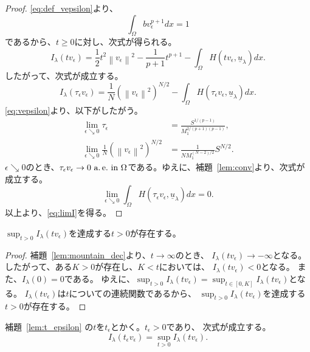 \begin{proof}
 \eqref{eq:def_vepsilon}より、
 \[
  \int_\Omega bv_\epsilon^{p+1} dx = 1
 \]
 であるから、$t \geq 0$に対し、次式が得られる。
 \[
  I_\lambda(tv_\epsilon) = \frac{1}{2} t^2 \left\| v_\epsilon
 \right\|^2 - \frac{1}{p+1} t^{p+1} - \int_\Omega H(tv_\epsilon,
 \underline{u}_\lambda) dx.
 \]
 したがって、次式が成立する。
 \[
  I_\lambda(\tau_\epsilon v_\epsilon) = \frac{1}{N} \left( \left\|
 v_\epsilon \right\|^2 \right)^{N/2} - \int_\Omega H(\tau_\epsilon
 v_\epsilon, \underline{u}_\lambda) dx.
 \]
 \eqref{eq:vepsilon}より、以下がしたがう。
 \begin{align*}
  \lim_{\epsilon \searrow 0} \tau_\epsilon
  &= \frac{S^{1/(p-1)}}{M_1^{2/(p+1)(p-1)}}, \\
  \lim_{\epsilon \searrow 0} \frac{1}{N} \left( \left\|
 v_\epsilon \right\|^2 \right)^{N/2} &= \frac{1}{NM_1^{(N-2)/2}}
  S^{N/2}.
 \end{align*}
 $\epsilon \searrow 0$のとき、$\tau_\epsilon v_\epsilon \to 0 ~\text{a.\,e.}~
 \text{in}~ \Omega$である。ゆえに、補題~\ref{lem:conv}より、次式が成立する。
 \[
  \lim_{\epsilon \searrow 0} \int_\Omega H(\tau_\epsilon
 v_\epsilon, \underline{u}_\lambda) dx = 0.
 \]
 以上より、\eqref{eq:limI}を得る。\qedhere
\end{proof}

\begin{lem} \label{lem:t_epsilon}
$\sup_{t > 0} I_\lambda (tv_\epsilon)$を達成する$t > 0$が存在する。
\end{lem}

\begin{proof}
補題~\ref{lem:mountain_dec}より、$t \to \infty$のとき、
$I_\lambda(t v_\epsilon) \to -\infty$となる。
したがって、ある$K>0$が存在し、$K < t$においては、
$I_\lambda(t v_\epsilon) < 0$となる。
また、$I_\lambda(0) = 0$である。
ゆえに、$\sup_{t > 0} I_\lambda (tv_\epsilon) = 
\sup_{t \in [0, K]} I_\lambda (tv_\epsilon)$となる。
$I_\lambda(tv_\epsilon)$は$t$についての連続関数であるから、
$\sup_{t > 0} I_\lambda (tv_\epsilon)$を達成する$t > 0$が存在する。\qedhere
\end{proof}

\begin{nota}
 補題~\ref{lem:t_epsilon}
 の$t$を$t_\epsilon$とかく。$t_\epsilon > 0$であり、
 次式が成立する。
 \begin{equation}
  I_\lambda(t_\epsilon v_\epsilon) = \sup_{t > 0} I_\lambda(t
   v_\epsilon).
   \label{eq:t_epsilon}
 \end{equation}
\end{nota}

